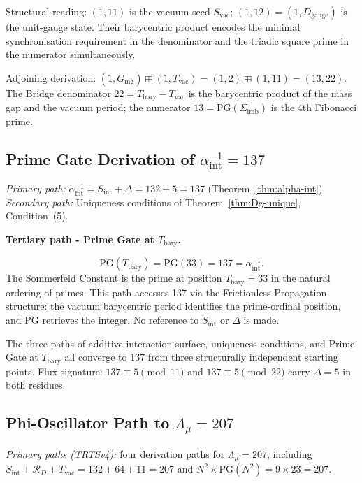 \documentclass[11pt, letterpaper]{article}
\newcommand{\bplus}{\boxplus}
\newcommand{\Tbary}{T_{\mathrm{bary}}}
\newcommand{\Dg}{D_{\mathrm{gauge}}}
\newcommand{\Sint}{S_{\mathrm{int}}}
\newcommand{\Sigimb}{\Sigma_{\mathrm{imb}}}
\newcommand{\PG}{\mathrm{PG}}
\theoremstyle{definition}
\theoremstyle{plain}
\begin{document}
Structural reading: $(1,11)$ is the vacuum seed $S_{\mathrm{vac}}$;
$(1,12)=(1,\Dg)$ is the unit-gauge state.  Their barycentric product encodes
the minimal synchronisation requirement in the denominator and the triadic
square prime in the numerator simultaneously.

\medskip\noindent Adjoining derivation: $(1,G_{\mathrm{mg}})\bplus(1,T_{\mathrm{vac}})
=(1,2)\bplus(1,11)=(13,22)$.  The Bridge denominator $22=\Tbary-T_{\mathrm{vac}}$
is the barycentric product of the mass gap and the vacuum period; the
numerator $13=\PG(\Sigimb)$ is the 4th Fibonacci prime.

\subsection{Prime Gate Derivation of $\alpha^{-1}_{\mathrm{int}}=137$}
\label{app:alpha-primegate}

\noindent\textit{Primary path:}
$\alpha^{-1}_{\mathrm{int}}=\Sint+\Delta=132+5=137$
(Theorem~\ref{thm:alpha-int}).\\
\textit{Secondary path:} Uniqueness conditions of Theorem~\ref{thm:Dg-unique},
Condition~(5).

\medskip
\noindent\textbf{Tertiary path - Prime Gate at $T_{\mathrm{bary}}$.}

\begin{rsbox}
\[
\PG(T_{\mathrm{bary}}) = \PG(33) = 137 = \alpha^{-1}_{\mathrm{int}}.
\]
The Sommerfeld Constant is the prime at position $T_{\mathrm{bary}}=33$
in the natural ordering of primes.  This path accesses 137 via the
Frictionless Propagation structure: the vacuum barycentric period identifies
the prime-ordinal position, and $\PG$ retrieves the integer.  No reference
to $\Sint$ or $\Delta$ is made.
\end{rsbox}

The three paths of additive interaction surface, uniqueness conditions, and
Prime Gate at $T_{\mathrm{bary}}$ all converge to 137 from three structurally
independent starting points.  Flux signature: $137\equiv 5\pmod{11}$ and
$137\equiv 5\pmod{22}$ carry $\Delta=5$ in both residues.

\subsection{Phi-Oscillator Path to $\Lambda_\mu=207$}\label{app:lmu-phiosc}

\noindent\textit{Primary paths (TRTSv4):} four derivation paths for
$\Lambda_\mu=207$, including $\Sint+\mathcal{R}_D+T_{\mathrm{vac}}
=132+64+11=207$ and $N^2\times\PG(N^2)=9\times 23=207$.
\end{document}
